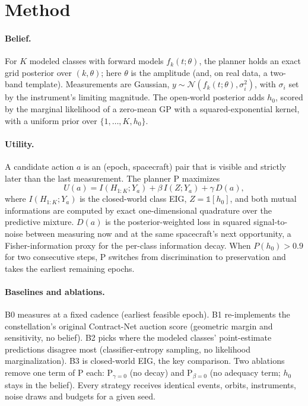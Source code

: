 \documentclass[10pt,twocolumn]{article}
\begin{document}
\section{Method}\label{sec:method}
\paragraph{Belief.} For $K$ modeled classes with forward models $f_k(t;\theta)$, the planner holds an exact grid posterior over $(k,\theta)$; here $\theta$ is the amplitude (and, on real data, a two-band template). Measurements are Gaussian, $y\sim\mathcal N(f_k(t;\theta),\sigma_i^2)$, with $\sigma_i$ set by the instrument's limiting magnitude. The open-world posterior adds $h_0$, scored by the marginal likelihood of a zero-mean GP with a squared-exponential kernel, with a uniform prior over $\{1,\dots,K,h_0\}$.

\paragraph{Utility.} A candidate action $a$ is an (epoch, spacecraft) pair that is visible and strictly later than the last measurement. The planner P maximizes
\begin{equation}
U(a) = I(H_{1:K};Y_a) + \beta\, I(Z;Y_a) + \gamma\, D(a),
\end{equation}
where $I(H_{1:K};Y_a)$ is the closed-world class EIG, $Z=\mathbb 1[h_0]$, and both mutual informations are computed by exact one-dimensional quadrature over the predictive mixture. $D(a)$ is the posterior-weighted loss in squared signal-to-noise between measuring now and at the same spacecraft's next opportunity, a Fisher-information proxy for the per-class information decay. When $P(h_0)>0.9$ for two consecutive steps, P switches from discrimination to preservation and takes the earliest remaining epochs.

\paragraph{Baselines and ablations.} B0 measures at a fixed cadence (earliest feasible epoch). B1 re-implements the constellation's original Contract-Net auction score (geometric margin and sensitivity, no belief). B2 picks where the modeled classes' point-estimate predictions disagree most (classifier-entropy sampling, no likelihood marginalization). B3 is closed-world EIG, the key comparison. Two ablations remove one term of P each: P$_{\gamma=0}$ (no decay) and P$_{\beta=0}$ (no adequacy term; $h_0$ stays in the belief). Every strategy receives identical events, orbits, instruments, noise draws and budgets for a given seed.
\end{document}
